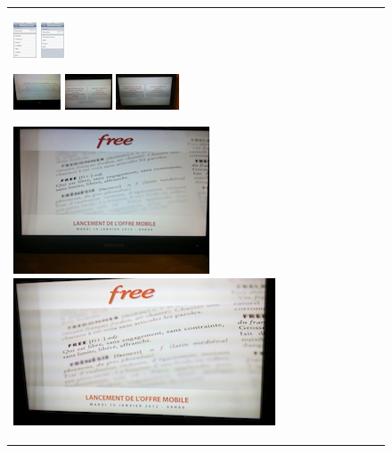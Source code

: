 \begin{figure}
\begin{tabular}{p{\textwidth}}
\begin{thumbsequence}
	\end{thumbsequence}
	\begin{thumbsequence}
		\includegraphics[height=\thumbheight]{free/looseduplicate3.jpg}
		\includegraphics[height=\thumbheight]{free/looseduplicate4.jpg}
	\end{thumbsequence}
	\newstrip
	\begin{thumbsequence}
		\includegraphics[height=\thumbheight]{free/looseduplicate12.jpg}
		\includegraphics[height=\thumbheight]{free/looseduplicate13.jpg}
		\includegraphics[height=\thumbheight]{free/looseduplicate14.jpg}
	\end{thumbsequence}
	\begin{thumbsequence}
		\includegraphics[height=\thumbheight]{free/looseduplicate5.jpg}
		\includegraphics[height=\thumbheight]{free/looseduplicate6.jpg}
	\end{thumbsequence}
\end{tabular}


\end{figure}
